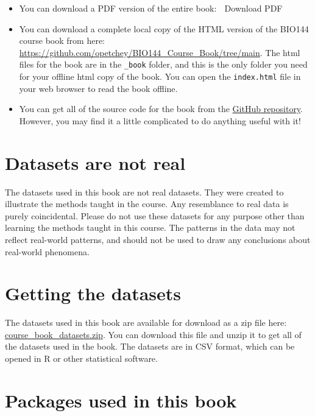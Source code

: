 \documentclass[
  letterpaper,
  8pt,
  a4paper]{book}
\begin{document}
\begin{itemize}
\item
  You can download a PDF version of the entire book: 📄 Download PDF
\item
  You can download a complete local copy of the HTML version of the
  BIO144 course book from here:\\
  \url{https://github.com/opetchey/BIO144_Course_Book/tree/main}. The
  html files for the book are in the \texttt{\_book} folder, and this is
  the only folder you need for your offline html copy of the book. You
  can open the \texttt{index.html} file in your web browser to read the
  book offline.
\item
  You can get all of the source code for the book from the
  \href{https://github.com/opetchey/BIO144_Course_Book}{GitHub
  repository}. However, you may find it a little complicated to do
  anything useful with it!
\end{itemize}

\section*{Datasets are not real}\label{datasets-are-not-real}


The datasets used in this book are not real datasets. They were created
to illustrate the methods taught in the course. Any resemblance to real
data is purely coincidental. Please do not use these datasets for any
purpose other than learning the methods taught in this course. The
patterns in the data may not reflect real-world patterns, and should not
be used to draw any conclusions about real-world phenomena.

\section*{Getting the datasets}\label{getting-the-datasets}


The datasets used in this book are available for download as a zip file
here: \url{course_book_datasets.zip}. You can download this file and
unzip it to get all of the datasets used in the book. The datasets are
in CSV format, which can be opened in R or other statistical software.

\section*{Packages used in this book}\label{packages-used-in-this-book}
\end{document}
